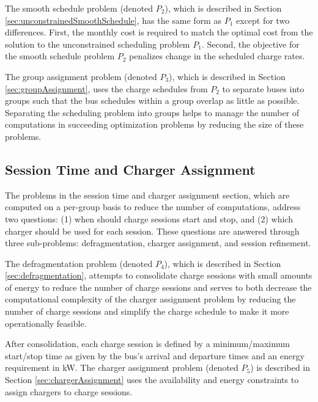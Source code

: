 \par The smooth schedule problem (denoted $P_2$), which is described in Section \ref{sec:unconstrainedSmoothSchedule}, has the same form as $P_1$ except for two differences.  First, the monthly cost is required to match the optimal cost from the solution to the unconstrained scheduling problem $P_1$. Second, the objective for the smooth schedule problem $P_2$ penalizes change in the scheduled charge rates.

\par The group assignment problem (denoted $P_3$), which is described in Section \ref{sec:groupAssignment}, uses the charge schedules from $P_2$ to separate buses into groups such that the bus schedules within a group overlap as little as possible.  Separating the scheduling problem into groups helps to manage the number of computations in succeeding optimization problems by reducing the size of these problems.

\subsection{Session Time and Charger Assignment}

The problems in the session time and charger assignment section, which are computed on a per-group basis to reduce the number of computations, address two questions: (1) when should charge sessions start and stop, and (2) which charger should be used for each session.  These questions are answered through three sub-problems: defragmentation, charger assignment, and session refinement.

\par The defragmentation problem (denoted $P_4$), which is described in Section \ref{sec:defragmentation}, attempts to consolidate charge sessions with small amounts of energy to reduce the number of charge sessions and serves to both decrease the computational complexity of the charger assignment problem by reducing the number of charge sessions and simplify the charge schedule to make it more operationally feasible.

\par After consolidation, each charge session is defined by a minimum/maximum start/stop time as given by the bus's arrival and departure times and an energy requirement in kW. The charger assignment problem (denoted $P_5$) is described in Section \ref{sec:chargerAssignment} uses the availability and energy constraints to assign chargers to charge sessions.

